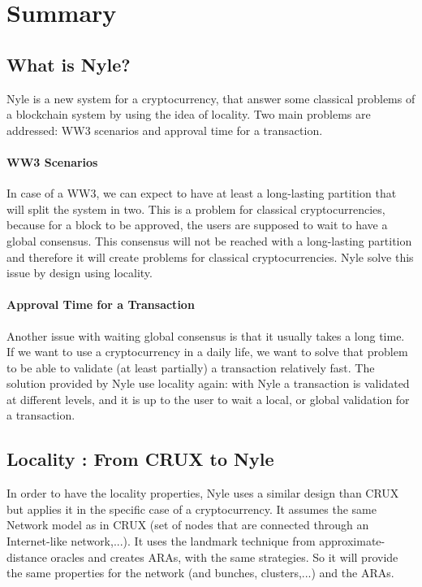 \section{Summary}

\subsection{What is Nyle?}

Nyle is a new system for a cryptocurrency, that answer some classical problems of a blockchain system by using the idea of locality. Two main problems are addressed: WW3 scenarios and approval time for a transaction. 

\paragraph{WW3 Scenarios} \label{WW3}
In case of a WW3, we can expect to have at least a long-lasting partition that will split the system in two. This is a problem for classical cryptocurrencies, because for a block to be approved, the users are supposed to wait to have a global consensus. This consensus will not be reached with a long-lasting partition and therefore it will create problems for classical cryptocurrencies. Nyle solve this issue by design using locality. 

\paragraph{Approval Time for a Transaction} \label{approve_time}
Another issue with waiting global consensus is that it usually takes a long time. If we want to use a cryptocurrency in a daily life, we want to solve that problem to be able to validate (at least partially) a transaction relatively fast. The solution provided by Nyle use locality again: with Nyle a transaction is validated at different levels, and it is up to the user to wait a local, or global validation for a transaction. 

\subsection{Locality : From CRUX to Nyle}

In order to have the locality properties, Nyle uses a similar design than CRUX but applies it in the specific case of a cryptocurrency. It assumes the same Network model as in CRUX (set of nodes that are connected through an Internet-like network,...). It uses the landmark technique from approximate-distance oracles and creates ARAs, with the same strategies. So it will provide the same properties for the network (and bunches, clusters,...) and the ARAs. 

